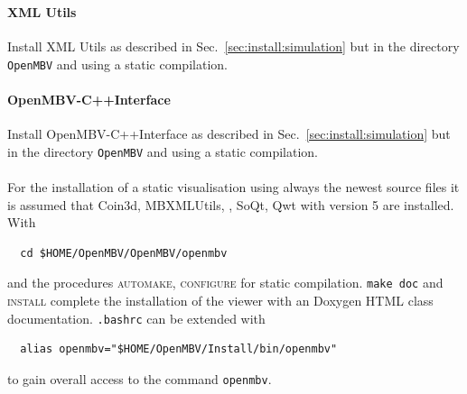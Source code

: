 \subsubsection{\OpenMBV{}}
\paragraph{XML Utils}
Install XML Utils as described in Sec.~\ref{sec:install:simulation} but in the directory \texttt{OpenMBV} and using a static compilation.

\paragraph{OpenMBV-C++Interface}
Install OpenMBV-C++Interface as described in Sec.~\ref{sec:install:simulation} but in the directory \texttt{OpenMBV} and using a static compilation.

\paragraph{\OpenMBV{}}
For the installation of a static visualisation using always the newest source files it is assumed that Coin3d, MBXMLUtils, \HDFSerie, SoQt, Qwt with version 5 are installed. With
\begin{verbatim}
  cd $HOME/OpenMBV/OpenMBV/openmbv
\end{verbatim} 
and the procedures \textsc{automake, configure} for static compilation. \texttt{make doc} and \textsc{install} complete the installation of the viewer with an Doxygen HTML class documentation. \texttt{.bashrc} can be extended with
\begin{verbatim}
  alias openmbv="$HOME/OpenMBV/Install/bin/openmbv"
\end{verbatim}
to gain overall access to the command \texttt{openmbv}.
